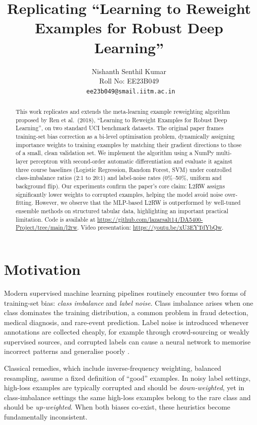 \documentclass{article}
\title{Replicating ``Learning to Reweight Examples for Robust Deep Learning''}
\author{
  Nishanth Senthil Kumar \\
  Roll No: EE23B049 \\\
  \texttt{ee23b049@smail.iitm.ac.in}
}
\begin{document}
\maketitle

\begin{abstract}
This work replicates and extends the meta-learning example reweighting algorithm
proposed by Ren et al.\ (2018), ``Learning to Reweight Examples for Robust Deep
Learning'', on two standard UCI benchmark datasets.
The original paper frames training-set bias correction as a bi-level optimisation
problem, dynamically assigning importance weights to training examples by
matching their gradient directions to those of a small, clean validation set.
We implement the algorithm using a NumPy multi-layer perceptron with
second-order automatic differentiation and evaluate it against three course
baselines (Logistic Regression, Random Forest, SVM) under controlled class-imbalance
ratios (2:1 to 20:1) and label-noise rates (0\%–50\%, uniform and background flip).
Our experiments confirm the paper's core claim: L2RW assigns significantly lower
weights to corrupted examples, helping the model avoid noise over-fitting.
However, we observe that the MLP-based L2RW is outperformed by well-tuned
ensemble methods on structured tabular data, highlighting an important
practical limitation.
Code is available at \url{https://github.com/lazarsalt14/DA5400-Project/tree/main/l2rw}.
Video presentation: \url{https://youtu.be/xU3EYTdYbQw}.
\end{abstract}

\section{Motivation}

Modern supervised machine learning pipelines routinely encounter two forms of
training-set bias: \emph{class imbalance} and \emph{label noise}.
Class imbalance arises when one class dominates the training distribution, a
common problem in fraud detection, medical diagnosis, and rare-event prediction.
Label noise is introduced whenever annotations are collected cheaply, for
example through crowd-sourcing or weakly supervised sources, and corrupted
labels can cause a neural network to memorise incorrect patterns and
generalise poorly \citep{zhang2017rethinking}.

Classical remedies, which include inverse-frequency weighting, balanced resampling, assume a fixed definition of ``good'' examples.
In noisy label settings, high-loss examples are typically corrupted and should
be \emph{down-weighted}, yet in class-imbalance settings the same high-loss
examples belong to the rare class and should be \emph{up-weighted}.
When both biases co-exist, these heuristics become fundamentally inconsistent.
\end{document}
